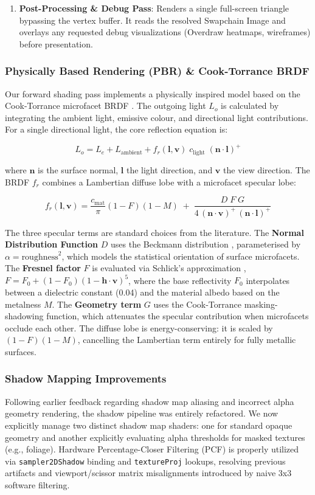 \documentclass[acmtog, nonacm]{acmart}
\begin{document}
\begin{enumerate}
    \item \textbf{Post-Processing \& Debug Pass}: Renders a single full-screen triangle bypassing the vertex buffer. It reads the resolved Swapchain Image and overlays any requested debug visualizations (Overdraw heatmaps, wireframes) before presentation.
\end{enumerate}

\subsubsection{Physically Based Rendering (PBR) \& Cook-Torrance BRDF}
Our forward shading pass implements a physically inspired model based on the Cook-Torrance microfacet BRDF \cite{CookTorrance}. The outgoing light $L_o$ is calculated by integrating the ambient light, emissive colour, and directional light contributions. For a single directional light, the core reflection equation is:

\[ L_o = L_e + L_{\text{ambient}} + f_r(\mathbf{l}, \mathbf{v})\; c_{\text{light}}\; (\mathbf{n} \cdot \mathbf{l})^+ \]

where $\mathbf{n}$ is the surface normal, $\mathbf{l}$ the light direction, and $\mathbf{v}$ the view direction. The BRDF $f_r$ combines a Lambertian diffuse lobe with a microfacet specular lobe:

\[ f_r(\mathbf{l}, \mathbf{v}) = \frac{c_{\text{mat}}}{\pi}(1 - F)(1 - M) \;+\; \frac{D\; F\; G}{4\,(\mathbf{n} \cdot \mathbf{v})^+\,(\mathbf{n} \cdot \mathbf{l})^+} \]

The three specular terms are standard choices from the literature. The \textbf{Normal Distribution Function} $D$ uses the Beckmann distribution \cite{Beckmann}, parameterised by $\alpha = \text{roughness}^2$, which models the statistical orientation of surface microfacets. The \textbf{Fresnel factor} $F$ is evaluated via Schlick's approximation \cite{Schlick}, $F = F_0 + (1 - F_0)(1 - \mathbf{h} \cdot \mathbf{v})^5$, where the base reflectivity $F_0$ interpolates between a dielectric constant (0.04) and the material albedo based on the metalness $M$. The \textbf{Geometry term} $G$ uses the Cook-Torrance masking-shadowing function, which attenuates the specular contribution when microfacets occlude each other. The diffuse lobe is energy-conserving: it is scaled by $(1 - F)(1 - M)$, cancelling the Lambertian term entirely for fully metallic surfaces.

\subsubsection{Shadow Mapping Improvements}
Following earlier feedback regarding shadow map aliasing and incorrect alpha geometry rendering, the shadow pipeline was entirely refactored. We now explicitly manage two distinct shadow map shaders: one for standard opaque geometry and another explicitly evaluating alpha thresholds for masked textures (e.g., foliage). Hardware Percentage-Closer Filtering (PCF) is properly utilized via \texttt{sampler2DShadow} binding and \texttt{textureProj} lookups, resolving previous artifacts and viewport/scissor matrix misalignments introduced by naive 3x3 software filtering.
\end{document}
